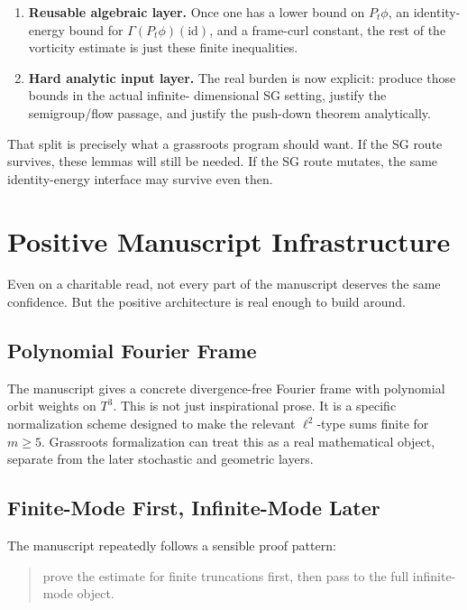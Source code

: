 \documentclass[11pt]{article}
\theoremstyle{remark}
\begin{document}
\begin{enumerate}[leftmargin=1.5em]
  \item \textbf{Reusable algebraic layer.}
  Once one has a lower bound on \(P_t \phi\), an identity-energy bound for
  \(\Gamma(P_t\phi)(\mathrm{id})\), and a frame-curl constant, the rest of the
  vorticity estimate is just these finite inequalities.
  \item \textbf{Hard analytic input layer.}
  The real burden is now explicit: produce those bounds in the actual infinite-
  dimensional SG setting, justify the semigroup/flow passage, and justify the
  push-down theorem analytically.
\end{enumerate}

That split is precisely what a grassroots program should want.  If the SG route
survives, these lemmas will still be needed.  If the SG route mutates, the same
identity-energy interface may survive even then.

\section{Positive Manuscript Infrastructure}

Even on a charitable read, not every part of the manuscript deserves the same
confidence.  But the positive architecture is real enough to build around.

\subsection{Polynomial Fourier Frame}

The manuscript gives a concrete divergence-free Fourier frame with polynomial
orbit weights on \(T^3\).  This is not just inspirational prose.  It is a
specific normalization scheme designed to make the relevant \(\ell^2\)-type
sums finite for \(m \ge 5\).  Grassroots formalization can treat this as a real
mathematical object, separate from the later stochastic and geometric layers.

\subsection{Finite-Mode First, Infinite-Mode Later}

The manuscript repeatedly follows a sensible proof pattern:
\begin{quote}
prove the estimate for finite truncations first, then pass to the full
infinite-mode object.
\end{quote}
\end{document}
